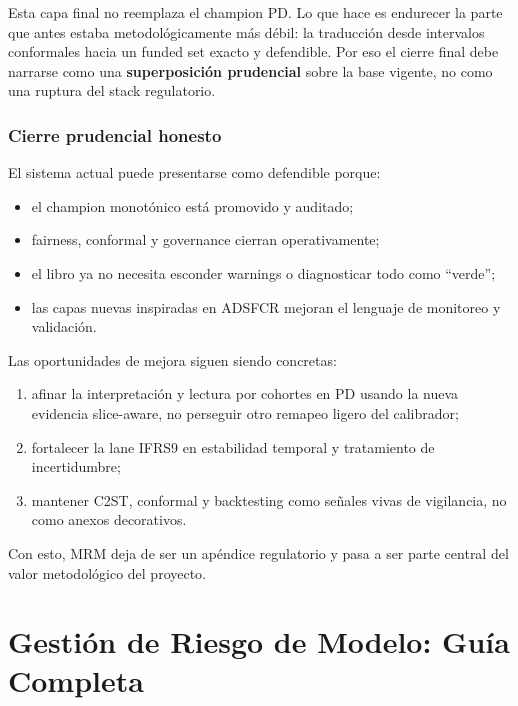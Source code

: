 \documentclass[
  spanish,
  11pt,
  letterpaper,
]{scrbook}
\providecommand{\tightlist}{%
  \setlength{\itemsep}{0pt}\setlength{\parskip}{0pt}}
\theoremstyle{plain}
\theoremstyle{remark}
\begin{document}
Esta capa final no reemplaza el champion PD. Lo que hace es endurecer la
parte que antes estaba metodológicamente más débil: la traducción desde
intervalos conformales hacia un funded set exacto y defendible. Por eso
el cierre final debe narrarse como una \textbf{superposición prudencial}
sobre la base vigente, no como una ruptura del stack regulatorio.

\subsection{Cierre prudencial honesto}\label{cierre-prudencial-honesto}

El sistema actual puede presentarse como defendible porque:

\begin{itemize}
\tightlist
\item
  el champion monotónico está promovido y auditado;
\item
  fairness, conformal y governance cierran operativamente;
\item
  el libro ya no necesita esconder warnings o diagnosticar todo como
  ``verde'';
\item
  las capas nuevas inspiradas en ADSFCR mejoran el lenguaje de monitoreo
  y validación.
\end{itemize}

Las oportunidades de mejora siguen siendo concretas:

\begin{enumerate}
\def\labelenumi{\arabic{enumi}.}
\tightlist
\item
  afinar la interpretación y lectura por cohortes en PD usando la nueva
  evidencia slice-aware, no perseguir otro remapeo ligero del
  calibrador;
\item
  fortalecer la lane IFRS9 en estabilidad temporal y tratamiento de
  incertidumbre;
\item
  mantener C2ST, conformal y backtesting como señales vivas de
  vigilancia, no como anexos decorativos.
\end{enumerate}

Con esto, MRM deja de ser un apéndice regulatorio y pasa a ser parte
central del valor metodológico del proyecto.

\chapter{Gestión de Riesgo de Modelo: Guía
Completa}\label{gestiuxf3n-de-riesgo-de-modelo-guuxeda-completa}
\end{document}
